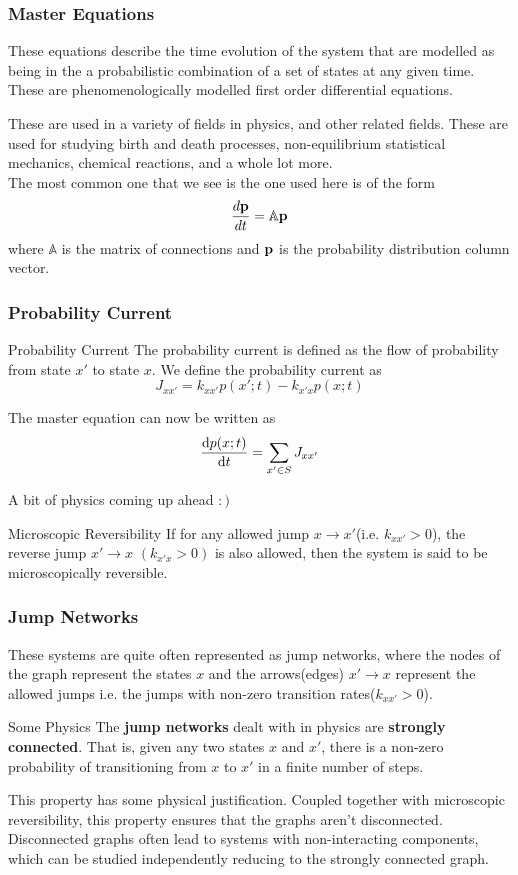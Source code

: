 \documentclass[9pt]{beamer}
\newcommand{\A}{\mathbb{A}}
\begin{document}
\begin{frame}
    \frametitle{Master Equations}
    These equations describe the time evolution of the system that are modelled as being in the
    a probabilistic combination of a set of states at any given time. These are phenomenologically modelled 
    first order differential equations. 

    These are used in a variety of fields in physics, and other related fields. These are used for 
    studying birth and death processes, non-equilibrium statistical mechanics, chemical reactions, and a whole lot more. \\ 

    The most common one that we see is the one used here is of the form 
    $$ \frac{d \bold{p}}{ dt} = \A \bold{p} $$
    where $\A$ is the matrix of connections and $\bold{p}$ is the probability distribution column vector.
\end{frame}
\begin{frame}
  \frametitle{Probability Current}
  \begin{block}{Probability Current}
    The probability current is defined as the flow of probability from state $x'$ to state $x$.
    We define the probability current as
    $$J_{xx'} = k_{xx'}p(x';t) - k_{x'x}p(x;t)$$
  \end{block}
    The master equation can now be written as
    $$\dv{p(x;t)}{t} = \sum_{x' \in S} J_{xx'}$$

    A bit of physics coming up ahead $:)$
    
    \begin{block}{Microscopic Reversibility}
      If for any allowed jump $x \rightarrow x'$(i.e. $k_{xx'} > 0$), the reverse jump $x' \rightarrow x$ $(k_{x'x}>0)$ is also allowed, then the system is said to be microscopically reversible.
  
    \end{block}

\end{frame}
\begin{frame}
  \frametitle{Jump Networks}
  These systems are quite often represented as jump networks, where the nodes of the graph 
  represent the states $x$ and the arrows(edges) $ x' \rightarrow x$ represent the allowed jumps  
  i.e. the jumps with non-zero transition rates($k_{xx'}>0$).

  \begin{block}{Some Physics}
    The \textbf{jump networks} dealt with in physics are \textbf{strongly connected}. 
    That is, given any two states $x$ and $x'$, there is a non-zero probability 
    of transitioning from $x$ to $x'$ in a finite number of steps.
\end{block}
This property has some physical justification. Coupled together with microscopic reversibility, 
this property ensures that the graphs aren't disconnected. Disconnected graphs often lead to systems 
with non-interacting components, which can be studied independently reducing to the strongly connected graph.
\\
\end{frame}
\end{document}
